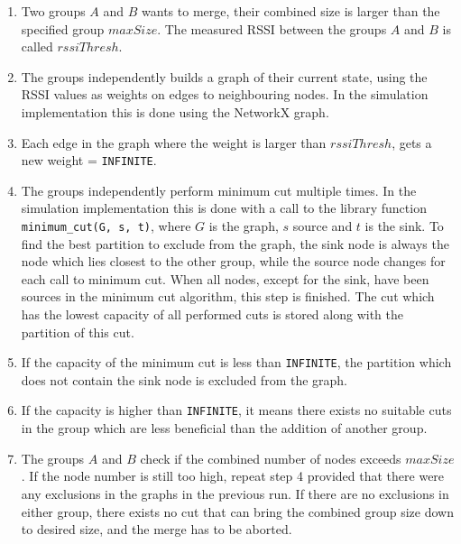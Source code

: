 \begin{enumerate}
	\item Two groups $A$ and $B$ wants to merge, their combined size is larger than the specified group $maxSize$. The measured RSSI between the groups $A$ and $B$ is called $rssiThresh$. 
	\item The groups independently builds a graph of their current state, using the RSSI values as weights on edges to neighbouring nodes. In the simulation implementation this is done using the NetworkX graph.
	\item Each edge in the graph where the weight is larger than  $rssiThresh$, gets a new weight = \verb|INFINITE|.
	\item The groups independently perform minimum cut multiple times. In the simulation implementation this is done with a call to the library function \verb|minimum_cut(G, s, t)|,
		where $G$ is the graph, $s$ source and $t$ is the sink. To find the best partition to exclude from the graph, the  sink node is always the node which lies closest to the other group,
		while the source node changes for each call to minimum cut. When all nodes, except for the sink, have been sources in the minimum cut algorithm, this step is finished. The cut
		which has the lowest capacity of all performed cuts is stored along with the partition of this cut. 
	\item If the capacity of the minimum cut is less than \verb|INFINITE|, the partition which does not contain the sink node is excluded from the graph. 
  \item If the capacity is higher than \verb|INFINITE|, it means there exists no suitable cuts in the group which are less beneficial than the addition of another group. 
	\item The groups $A$ and $B$ check if the combined number of nodes exceeds $maxSize$. If the node number is still too high, repeat step 4 provided that there were any 
		exclusions in the graphs in the previous run. If there are no exclusions in either group, there exists no cut that can bring the combined group size down to desired size, and the
		merge has to be aborted. 

\end{enumerate}

